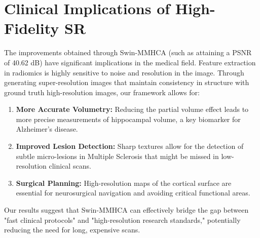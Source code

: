 \section{Clinical Implications of High-Fidelity SR}
The improvements obtained through Swin-MMHCA (such as attaining a PSNR of 40.62 dB) have significant implications in the medical field. Feature extraction in radiomics is highly sensitive to noise and resolution in the image. Through generating super-resolution images that maintain consistency in structure with ground truth high-resolution images, our framework allows for:
\begin{enumerate}
    \item \textbf{More Accurate Volumetry:} Reducing the partial volume effect leads to more precise measurements of hippocampal volume, a key biomarker for Alzheimer's disease.
    \item \textbf{Improved Lesion Detection:} Sharp textures allow for the detection of subtle micro-lesions in Multiple Sclerosis that might be missed in low-resolution clinical scans.
    \item \textbf{Surgical Planning:} High-resolution maps of the cortical surface are essential for neurosurgical navigation and avoiding critical functional areas.
\end{enumerate}
Our results suggest that Swin-MMHCA can effectively bridge the gap between "fast clinical protocols" and "high-resolution research standards," potentially reducing the need for long, expensive scans.
